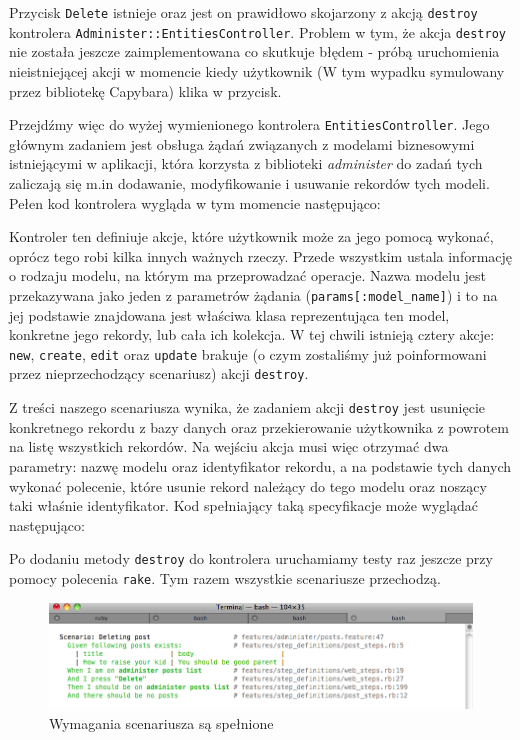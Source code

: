   Przycisk \texttt{Delete} istnieje oraz jest on prawidłowo skojarzony z akcją \texttt{destroy} kontrolera \texttt{Administer::EntitiesController}. Problem w tym, że akcja \texttt{destroy} nie została jeszcze zaimplementowana co skutkuje błędem - próbą uruchomienia nieistniejącej akcji w momencie kiedy użytkownik (W tym wypadku symulowany przez bibliotekę Capybara) klika w przycisk.
  
  Przejdźmy więc do wyżej wymienionego kontrolera \texttt{EntitiesController}. Jego głównym zadaniem jest obsługa żądań związanych z modelami biznesowymi istniejącymi w aplikacji, która korzysta z biblioteki \emph{administer} do zadań tych zaliczają się m.in dodawanie, modyfikowanie i usuwanie rekordów tych modeli. Pełen kod kontrolera wygląda w tym momencie następująco:
  
  
  
  Kontroler ten definiuje akcje, które użytkownik może za jego pomocą wykonać, oprócz tego robi kilka innych ważnych rzeczy. Przede wszystkim ustala informację o rodzaju modelu, na którym ma przeprowadzać operacje. Nazwa modelu jest przekazywana jako jeden z parametrów żądania (\verb+params[:model_name]+) i to na jej podstawie znajdowana jest właściwa klasa reprezentująca ten model, konkretne jego rekordy, lub cała ich kolekcja.
  W tej chwili istnieją cztery akcje: \texttt{new}, \texttt{create}, \texttt{edit} oraz \texttt{update} brakuje (o czym zostaliśmy już poinformowani przez nieprzechodzący scenariusz) akcji \texttt{destroy}.
  
  Z treści naszego scenariusza wynika, że zadaniem akcji \texttt{destroy} jest usunięcie konkretnego rekordu z bazy danych oraz przekierowanie użytkownika z powrotem na listę wszystkich rekordów. Na wejściu akcja musi więc otrzymać dwa parametry: nazwę modelu oraz identyfikator rekordu, a na podstawie tych danych wykonać polecenie, które usunie rekord należący do tego modelu oraz noszący taki właśnie identyfikator. Kod spełniający taką specyfikacje może wyglądać następująco: 
  
  
  
  Po dodaniu metody \texttt{destroy} do kontrolera uruchamiamy testy raz jeszcze przy pomocy polecenia \texttt{rake}. Tym razem wszystkie scenariusze przechodzą.
  
  \clearpage
  
   \begin{figure}[!h]
 		\begin{center}
 			\includegraphics[width=\linewidth]{images/delete_record_scenario_pass.png}
 			\caption{Wymagania scenariusza są spełnione}
 			\label{delete_record_scenario_pass}
 		\end{center}
 	\end{figure}
 	
